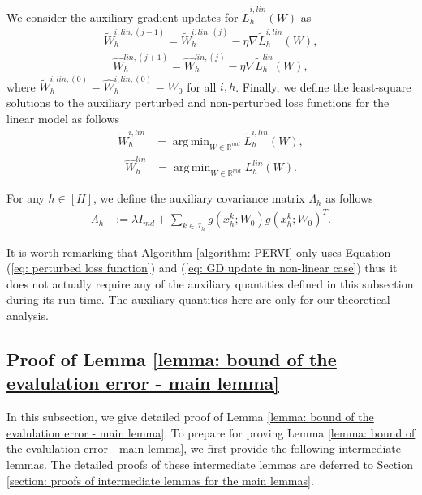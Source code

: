 \documentclass{article} \usepackage{iclr2023/iclr2023_conference,times}
\DeclareMathOperator*{\argmin}{arg\,min}
\begin{document}
We consider the auxiliary gradient updates for $\tilde{L}^{i,lin}_h(W)$ as 
\begin{align}
    \tilde{W}^{i,lin,(j+1)}_h = \tilde{W}^{i,lin,(j)}_h - \eta \nabla \tilde{L}^{i,lin}_h(W),
    \label{eq: GD update in linear case}
\end{align}
\begin{align}
    \hat{W}^{lin,(j+1)}_h = \hat{W}^{lin,(j)}_h - \eta \nabla \tilde{L}^{lin}_h(W),
    \label{eq: GD update in linear case for non-perturbed data}
\end{align}
where $\tilde{W}^{i,lin,(0)}_h = \hat{W}^{i,lin,(0)}_h = W_0$ for all $i,h$. Finally, we  define the least-square solutions to the auxiliary perturbed and non-perturbed loss functions for the linear model as follows  
\begin{align}
\tilde{W}^{i,lin}_h &= \argmin_{W \in \mathbb{R}^{md}} \tilde{L}^{i,lin}_h(W),
    \label{eq: tilde W i lin h}
\end{align}
\begin{align}
    \hat{W}_h^{lin} &= \argmin_{W \in \mathbb{R}^{md}} L_h^{lin}(W). 
    \label{eq: hat W_h lin}
\end{align}

For any $h \in [H]$, we define the auxiliary covariance matrix $\Lambda_h$ as follows 
\begin{align}
    \Lambda_h &:= \lambda I_{md} + \sum_{k \in \mathcal{I}_h} g(x^k_h; W_0) g(x^k_h; W_0)^T. 
\end{align}

It is worth remarking that Algorithm \ref{algorithm: PERVI} only uses Equation (\ref{eq: perturbed loss function}) and (\ref{eq: GD update in non-linear case}) thus it does not actually require any of the auxiliary quantities defined in this subsection during its run time. The auxiliary quantities here are only for our theoretical analysis. 

\subsection{Proof of Lemma \ref{lemma: bound of the evalulation error - main lemma}}
In this subsection, we give detailed proof of Lemma \ref{lemma: bound of the evalulation error - main lemma}. To prepare for proving Lemma \ref{lemma: bound of the evalulation error - main lemma}, we first provide the following intermediate lemmas. The detailed proofs of these intermediate lemmas are deferred to Section \ref{section: proofs of intermediate lemmas for the main lemmas}. 
\end{document}

